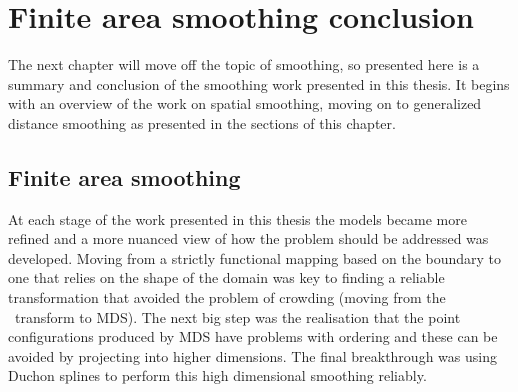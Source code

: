 \section{Finite area smoothing conclusion}
\label{gds-conclusion}

The next chapter will move off the topic of smoothing, so presented here is a summary and conclusion of the smoothing work presented in this thesis. It begins with an overview of the work on spatial smoothing, moving on to generalized distance smoothing as presented in the sections of this chapter.

\subsection{Finite area smoothing}

At each stage of the work presented in this thesis the models became more refined and a more nuanced view of how the problem should be addressed was developed. Moving from a strictly functional mapping based on the boundary to one that relies on the shape of the domain was key to finding a reliable transformation that avoided the problem of crowding (moving from the \sch\ transform to MDS). The next big step was the realisation that the point configurations produced by MDS have problems with ordering and these can be avoided by projecting into higher dimensions. The final breakthrough was using Duchon splines to perform this high dimensional smoothing reliably.

